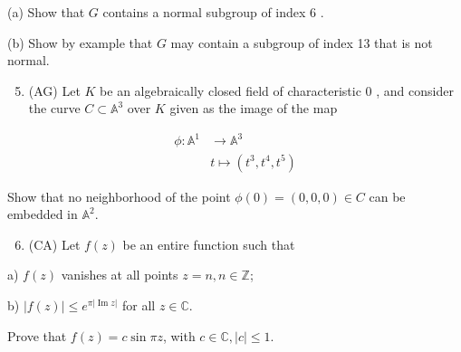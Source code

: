 \documentclass[10pt]{article}
\begin{document}
(a) Show that $G$ contains a normal subgroup of index 6 .

(b) Show by example that $G$ may contain a subgroup of index 13 that is not normal.

\begin{enumerate}
  \setcounter{enumi}{4}
  \item (AG) Let $K$ be an algebraically closed field of characteristic 0 , and consider the curve $C \subset \mathbb{A}^{3}$ over $K$ given as the image of the map
\end{enumerate}

$$
\begin{aligned}
\phi: \mathbb{A}^{1} & \rightarrow \mathbb{A}^{3} \\
& t \mapsto\left(t^{3}, t^{4}, t^{5}\right)
\end{aligned}
$$

Show that no neighborhood of the point $\phi(0)=(0,0,0) \in C$ can be embedded in $\mathbb{A}^{2}$.

\begin{enumerate}
  \setcounter{enumi}{5}
  \item (CA) Let $f(z)$ be an entire function such that
\end{enumerate}

a) $f(z)$ vanishes at all points $z=n, n \in \mathbb{Z}$;

b) $|f(z)| \leq e^{\pi|\operatorname{Im} z|}$ for all $z \in \mathbb{C}$.

Prove that $f(z)=c \sin \pi z$, with $c \in \mathbb{C},|c| \leq 1$.
\end{document}
